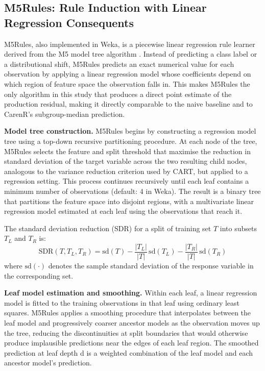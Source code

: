 \subsection{M5Rules: Rule Induction with Linear Regression Consequents}\label{sub:m5rules_rule_induction_with}

M5Rules, also implemented in Weka, is a piecewise linear regression rule learner derived from the M5 model tree algorithm \citep{Quinlan1992,Wang1997}. Instead of predicting a class label or a distributional shift, M5Rules predicts an exact numerical value for each observation by applying a linear regression model whose coefficients depend on which region of feature space the observation falls in. This makes M5Rules the only algorithm in this study that produces a direct point estimate of the production residual, making it directly comparable to the naive baseline and to CarenR's subgroup-median prediction.

\textbf{Model tree construction. }M5Rules begins by constructing a regression model tree using a top-down recursive partitioning procedure. At each node of the tree, M5Rules selects the feature and split threshold that maximise the reduction in standard deviation of the target variable across the two resulting child nodes, analogous to the variance reduction criterion used by CART, but applied to a regression setting. This process continues recursively until each leaf contains a minimum number of observations (default: 4 in Weka). The result is a binary tree that partitions the feature space into disjoint regions, with a multivariate linear regression model estimated at each leaf using the observations that reach it.

The standard deviation reduction (SDR) for a split of training set $T$ into subsets $T_L$ and $T_R$ is:
\begin{equation}
  \text{SDR}(T, T_L, T_R) = \text{sd}(T) - \frac{|T_L|}{|T|}\,\text{sd}(T_L) - \frac{|T_R|}{|T|}\,\text{sd}(T_R)
  \label{eq:sdr}
\end{equation}
where $\text{sd}(\cdot)$ denotes the sample standard deviation of the response variable in the corresponding set.

\textbf{Leaf model estimation and smoothing. }Within each leaf, a linear regression model is fitted to the training observations in that leaf using ordinary least squares. M5Rules applies a smoothing procedure that interpolates between the leaf model and progressively coarser ancestor models as the observation moves up the tree, reducing the discontinuities at split boundaries that would otherwise produce implausible predictions near the edges of each leaf region. The smoothed prediction at leaf depth d is a weighted combination of the leaf model and each ancestor model's prediction.

